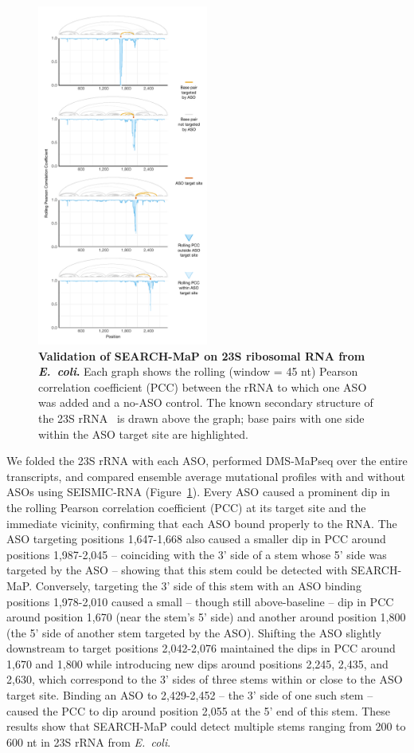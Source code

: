\documentclass[main.tex]{subfiles}
\begin{document}
\begin{figure}[H]
	\includegraphics[width=0.5\textwidth]{../MainFigures/rrna/rrna.pdf}
	\caption{\textbf{Validation of SEARCH-MaP on 23S ribosomal RNA from \textit{E.~coli}.} Each graph shows the rolling (window = 45 nt) Pearson correlation coefficient (PCC) between the rRNA to which one ASO was added and a no-ASO control. The known secondary structure of the 23S rRNA~\cite{Cannone2002} is drawn above the graph; base pairs with one side within the ASO target site are highlighted.}
	\label{rrna}
\end{figure}

We folded the 23S rRNA with each ASO, performed DMS-MaPseq over the entire transcripts, and compared ensemble average mutational profiles with and without ASOs using SEISMIC-RNA (Figure~\ref{rrna}).
Every ASO caused a prominent dip in the rolling Pearson correlation coefficient (PCC) at its target site and the immediate vicinity, confirming that each ASO bound properly to the RNA.
The ASO targeting positions 1,647-1,668 also caused a smaller dip in PCC around positions 1,987-2,045 -- coinciding with the 3' side of a stem whose 5' side was targeted by the ASO -- showing that this stem could be detected with SEARCH-MaP.
Conversely, targeting the 3' side of this stem with an ASO binding positions 1,978-2,010 caused a small -- though still above-baseline -- dip in PCC around position 1,670 (near the stem's 5' side) and another around position 1,800 (the 5' side of another stem targeted by the ASO).
Shifting the ASO slightly downstream to target positions 2,042-2,076 maintained the dips in PCC around 1,670 and 1,800 while introducing new dips around positions 2,245, 2,435, and 2,630, which correspond to the 3' sides of three stems within or close to the ASO target site.
Binding an ASO to 2,429-2,452 -- the 3' side of one such stem -- caused the PCC to dip around position 2,055 at the 5' end of this stem.
These results show that SEARCH-MaP could detect multiple stems ranging from 200 to 600 nt in 23S rRNA from \textit{E.~coli}.
\end{document}
